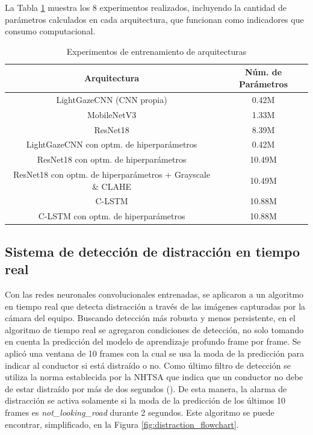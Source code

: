 La Tabla \ref{tab:tabla arq} muestra los 8 experimentos realizados, incluyendo la cantidad de parámetros calculados en cada arquitectura, que funcionan como indicadores que consumo computacional.

\begin{table}[h!]
    \centering
    \begin{tabular}{c|c}
          Arquitectura &  Núm. de Parámetros \\
         \hline
         LightGazeCNN (CNN propia)  & 0.42M \\
         \hline 
         MobileNetV3  & 1.33M \\
         \hline
         ResNet18 & 8.39M \\
         \hline
         LightGazeCNN con optm. de hiperparámetros & 0.42M \\
         \hline
         ResNet18 con optm. de hiperparámetros & 10.49M \\
         \hline
         ResNet18 con optm. de hiperparámetros + Grayscale \& CLAHE & 10.49M \\
         \hline
         C-LSTM & 10.88M \\
         \hline
         C-LSTM con optm. de hiperparámetros & 10.88M \\
         \hline
    \end{tabular}
    \caption{Experimentos de entrenamiento de arquitecturas}
    \label{tab:tabla arq}
\end{table}

\subsection{Sistema de detección de distracción en tiempo real}
Con las redes neuronales convolucionales entrenadas, se aplicaron a un algoritmo en tiempo real que detecta distracción a través de las imágenes capturadas por la cámara del equipo. Buscando detección más robusta y menos persistente, en el algoritmo de tiempo real se agregaron condiciones de detección, no solo tomando en cuenta la predicción del modelo de aprendizaje profundo frame por frame. Se aplicó una ventana de 10 frames con la cual se usa la moda de la predicción para indicar al conductor si está distraído o no. Como último filtro de detección se utiliza la norma establecida por la NHTSA que indica que un conductor no debe de estar distraído por más de dos segundos (\cite{NHTSA}). De esta manera, la alarma de distracción se activa solamente si la moda de la predicción de los últimos 10 frames es \textit{not\_looking\_road} durante 2 segundos. Este algoritmo se puede encontrar, simplificado, en la Figura \ref{fig:distraction_flowchart}.

